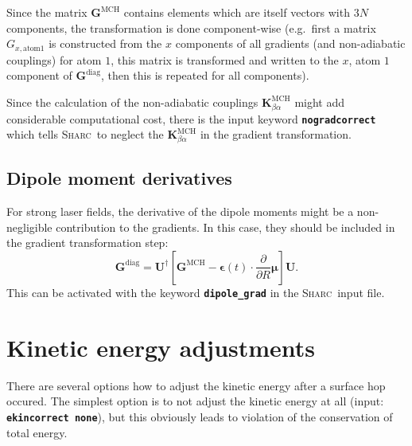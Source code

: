 \documentclass[a4paper,11pt,DIV=15,openany,twoside=false]{scrbook}
\newcommand{\sharc}{\textsc{Sharc}}
\newcommand{\ttt}[1]{\textbf{\texttt{#1}}}
\newcommand{\VEC}[1]{\ensuremath{\mathbf{#1}}}
\begin{document}
Since the matrix $\VEC{G}^{\text{MCH}}$ contains elements which are itself vectors with $3N$ components, the transformation is done component-wise (e.g.\ first a matrix $G_{x,\text{atom} 1}$ is constructed from the $x$ components of all gradients (and non-adiabatic couplings) for atom $1$, this matrix is transformed and written to the $x$, atom $1$ component of $\VEC{G}^{\text{diag}}$, then this is repeated for all components).

Since the calculation of the non-adiabatic couplings $\VEC{K}^{\text{MCH}}_{\beta\alpha}$ might add considerable computational cost, there is the input keyword \ttt{nogradcorrect} which tells \sharc\ to neglect the $\VEC{K}^{\text{MCH}}_{\beta\alpha}$ in the gradient transformation.

\subsection{Dipole moment derivatives}\label{met:dipolegrad}

For strong laser fields, the derivative of the dipole moments might be a non-negligible contribution to the gradients. In this case, they should be included in the gradient transformation step:
\begin{equation}
  \VEC{G}^{\text{diag}}=\VEC{U}^\dagger
  \left[
    \VEC{G}^{\text{MCH}}
    -\boldsymbol{\epsilon}(t)\cdot\frac{\partial}{\partial R}\boldsymbol{\mu}
  \right]\VEC{U}.
\end{equation}
This can be activated with the keyword \ttt{dipole\_grad} in the \sharc\ input file.


\section{Kinetic energy adjustments}\label{met:ekinadj}

There are several options how to adjust the kinetic energy after a surface hop occured. The simplest option is to not adjust the kinetic energy at all (input: \ttt{ekincorrect none}), but this obviously leads to violation of the conservation of total energy.
\end{document}
